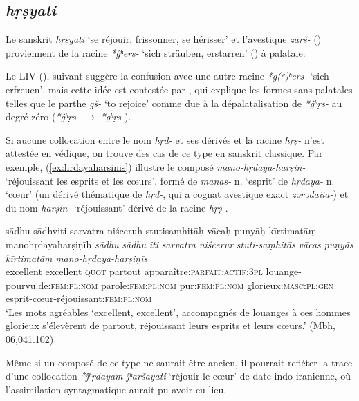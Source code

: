 \documentclass{article}
\newcommand{\ipa}[1]{{\phon\textit{#1}}}
\begin{document}
\subsection{\ipa{hṛṣyati}} \label{sec:hrsyati}
Le sanskrit \ipa{hṛṣyati} `se réjouir, frissonner, se hérisser' et l'avestique \ipa{zarš-} (\citealt[471]{cheung07dictionary}) proviennent de la racine \ipa{*ĝʰers-} `sich sträuben, erstarren' (\citealt[178]{liv}) à palatale. 

Le LIV (\citealt[198]{liv}), suivant \citet[808]{mayrhofer92ewa}  suggère la confusion avec une autre racine \ipa{*g(ʷ)ʰers-} `sich erfreuen', mais cette idée est contestée par \citet[471]{cheung07dictionary}, qui explique les formes sans palatales telles que le parthe \ipa{gš-}  `to rejoice' comme due à la dépalatalisation de \ipa{*ĝʰṛs-} au degré zéro (\ipa{*ĝʰṛs-} $\rightarrow$ \ipa{*gʰṛs-}).




Si aucune collocation entre le nom \ipa{hṛd-} et ses dérivés et la racine \ipa{hṛṣ-} n'est attestée en védique, on trouve des cas de ce type en sanskrit classique. Par exemple, (\ref{ex:hrdayaharsinis}) illustre le composé \ipa{mano-hṛdaya-harṣin-} `réjouissant les esprits et les cœurs', formé de \ipa{manas-} n. `esprit' de \ipa{hṛdaya-} n. `cœur' (un dérivé thématique de \ipa{hṛd-}, qui a cognat avestique exact \ipa{zərədaiia-}) et du nom \ipa{harṣin-} `réjouissant' dérivé de la racine \ipa{hṛṣ-}. 

\begin{exe}
\ex \label{ex:hrdayaharsinis}
\glt sādhu sādhviti sarvatra niśceruḥ stutisaṃhitāḥ
\glt vācaḥ puṇyāḥ kīrtimatāṃ manohṛdayaharṣiṇīḥ
\gll 
\ipa{sādhu} \ipa{sādhu} \ipa{iti} \ipa{sarvatra} \ipa{niścerur} \ipa{stuti-saṃhitās} 
\ipa{vācas} \ipa{puṇyās} \ipa{kīrtimatāṃ} \ipa{mano-hṛdaya-harṣiṇīs}\\
excellent excellent \textsc{quot} partout apparaître:\textsc{parfait:actif:3pl} louange-pourvu.de:\textsc{fem:pl:nom} parole:\textsc{fem:pl:nom}
pur:\textsc{fem:pl:nom} glorieux:\textsc{masc:pl:gen} esprit-cœur-réjouissant:\textsc{fem:pl:nom} \\ 
\glt `Les mots agréables `excellent, excellent', accompagnés de louanges à ces  hommes glorieux s'élevèrent de partout, réjouissant leurs esprits et leurs cœurs.' (Mbh, 06,041.102)
\end{exe}
Même si un composé de ce type ne saurait être ancien, il pourrait refléter la trace d'une collocation \ipa{*j́ʰṛdayam j́ʰaršayati} `réjouir le cœur' de date indo-iranienne, où l'assimilation syntagmatique aurait pu avoir eu lieu.
\end{document}
